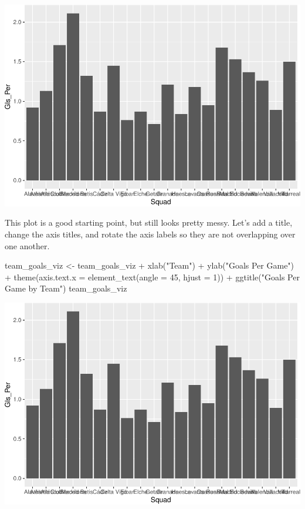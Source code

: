\documentclass[
  11pt,
]{book}
\newenvironment{Shaded}{\begin{snugshade}}{\end{snugshade}}
\newcommand{\AttributeTok}[1]{\textcolor[rgb]{0.77,0.63,0.00}{#1}}
\newcommand{\DecValTok}[1]{\textcolor[rgb]{0.00,0.00,0.81}{#1}}
\newcommand{\FunctionTok}[1]{\textcolor[rgb]{0.00,0.00,0.00}{#1}}
\newcommand{\NormalTok}[1]{#1}
\newcommand{\OtherTok}[1]{\textcolor[rgb]{0.56,0.35,0.01}{#1}}
\newcommand{\SpecialCharTok}[1]{\textcolor[rgb]{0.00,0.00,0.00}{#1}}
\newcommand{\StringTok}[1]{\textcolor[rgb]{0.31,0.60,0.02}{#1}}
\theoremstyle{definition}
\theoremstyle{definition}
\theoremstyle{definition}
\theoremstyle{definition}
\theoremstyle{remark}
\begin{document}
\includegraphics{series_files/figure-latex/unnamed-chunk-38-1.pdf}

This plot is a good starting point, but still looks pretty messy. Let's add a title, change the axis titles, and rotate the axis labels so they are not overlapping over one another.

\begin{Shaded}
\begin{Highlighting}[]
\NormalTok{team\_goals\_viz }\OtherTok{\textless{}{-}}\NormalTok{ team\_goals\_viz }\SpecialCharTok{+} \FunctionTok{xlab}\NormalTok{(}\StringTok{"Team"}\NormalTok{) }\SpecialCharTok{+} \FunctionTok{ylab}\NormalTok{(}\StringTok{"Goals Per Game"}\NormalTok{) }\SpecialCharTok{+} \FunctionTok{theme}\NormalTok{(}\AttributeTok{axis.text.x =} \FunctionTok{element\_text}\NormalTok{(}\AttributeTok{angle =} \DecValTok{45}\NormalTok{,}
    \AttributeTok{hjust =} \DecValTok{1}\NormalTok{)) }\SpecialCharTok{+} \FunctionTok{ggtitle}\NormalTok{(}\StringTok{"Goals Per Game by Team"}\NormalTok{)}
\NormalTok{team\_goals\_viz}
\end{Highlighting}
\end{Shaded}

\includegraphics{series_files/figure-latex/unnamed-chunk-39-1.pdf}
\end{document}
